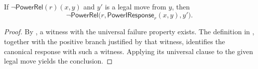 \begin{lemma}
If $\neg\mathsf{PowerRel}(r)(x,y)$ and $y'$ is a legal move from $y$, then
\[
\neg\mathsf{PowerRel}\bigl(r,\mathsf{PowerIResponse}_r(x,y),y'\bigr).
\]
\end{lemma}
\begin{proof}
By , a witness with the universal failure
property exists.  The definition in , together with
the positive branch justified by that witness, identifies the canonical
response with such a witness.  Applying its universal clause to the given
legal move  yields the conclusion.
\end{proof}
